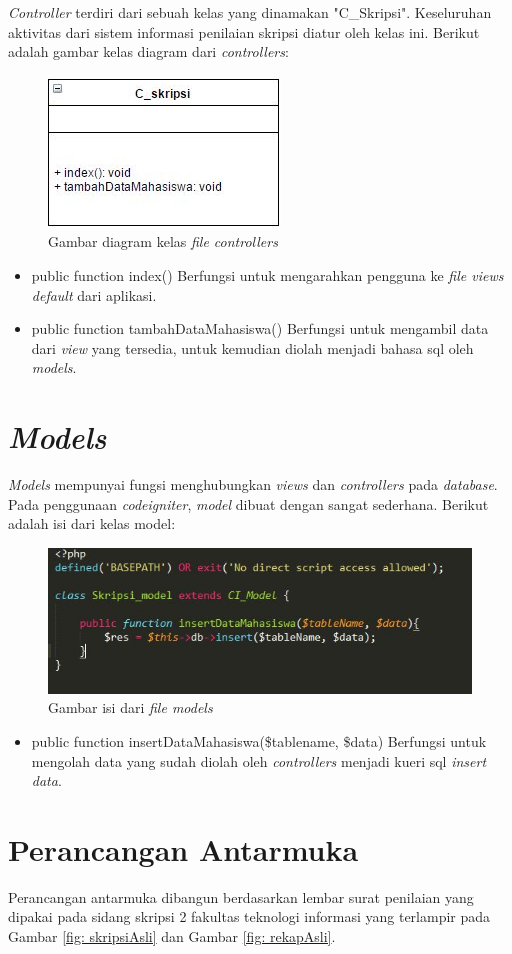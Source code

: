 	\textit{Controller} terdiri dari sebuah kelas yang dinamakan "C\_Skripsi". Keseluruhan aktivitas dari sistem informasi penilaian skripsi diatur oleh kelas ini. Berikut adalah gambar kelas diagram dari \textit{controllers}:
	\begin{figure}[H]
		\centering
		\includegraphics[scale= 1.0]{Gambar/C_skripsi}
		\caption {Gambar diagram kelas \textit{file controllers}}
		\label{fig:controllers}
	\end{figure}
	
	\begin{itemize}
		\item public function index()
		Berfungsi untuk mengarahkan pengguna ke \textit{file views default} dari aplikasi.
		\item public function tambahDataMahasiswa()
		Berfungsi untuk mengambil data dari \textit{view} yang tersedia, untuk kemudian diolah menjadi bahasa sql oleh \textit{models}.
	\end{itemize}
	
	\section{\textit{Models}}
	\label{sec: models}
	
	\textit{Models} mempunyai fungsi menghubungkan \textit{views} dan \textit{controllers} pada \textit{database}. Pada penggunaan \textit{codeigniter}, \textit{model} dibuat dengan sangat sederhana. Berikut adalah isi dari kelas model:
	\begin{figure}[H]
		\centering
		\includegraphics[scale= 1.0]{Gambar/models}
		\caption {Gambar isi dari \textit{file models}}
		\label{fig:models}
	\end{figure}
	\begin{itemize}
		\item public function insertDataMahasiswa(\$tablename, \$data)
		Berfungsi untuk mengolah data yang sudah diolah oleh \textit{controllers} menjadi kueri sql \textit{insert data}.
	\end{itemize}
	
	\section{Perancangan Antarmuka}
	\label{sec: antarmuka}
	
	Perancangan antarmuka dibangun berdasarkan lembar surat penilaian yang dipakai pada sidang skripsi 2 fakultas teknologi informasi yang terlampir pada Gambar \ref{fig: skripsiAsli} dan Gambar \ref{fig: rekapAsli}.